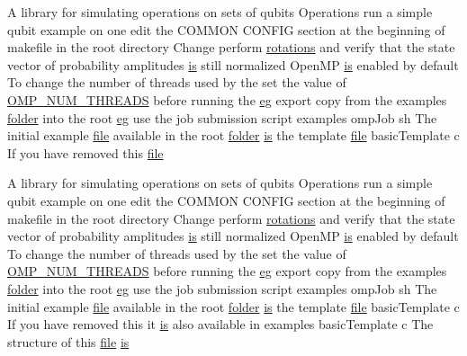 \begin{DoxyCompactItemize}
\item 
A library for simulating operations on sets of qubits Operations run a simple qubit example on one edit the COMMON CONFIG section at the beginning of makefile in the root directory Change perform \hyperlink{README_8md_a168d0f076329da35a2b080049c35cecd}{rotations} and verify that the state vector of probability amplitudes \hyperlink{README_8md_ac361bc388656077907485b42e1531a85}{is} still normalized OpenMP \hyperlink{README_8md_ac361bc388656077907485b42e1531a85}{is} enabled by default To change the number of threads used by the set the value of \hyperlink{README_8md_ac0f875e6c5b5526a6781e0fbba81e6a4}{OMP\_\-NUM\_\-THREADS} before running the \hyperlink{README_8md_a60a90a09308ad7ec0ea2ac389281518b}{eg} export copy from the examples \hyperlink{README_8md_ac5527449269e33be598e819921cd9e43}{folder} into the root \hyperlink{README_8md_a60a90a09308ad7ec0ea2ac389281518b}{eg} use the job submission script examples ompJob sh The initial example \hyperlink{README_8md_a5078360f0afc4e756290c3197d1abfe9}{file} available in the root \hyperlink{README_8md_ac5527449269e33be598e819921cd9e43}{folder} \hyperlink{README_8md_ac361bc388656077907485b42e1531a85}{is} the template \hyperlink{README_8md_a5078360f0afc4e756290c3197d1abfe9}{file} basicTemplate c If you have removed this \hyperlink{README_8md_a5078360f0afc4e756290c3197d1abfe9}{file}
\item 
A library for simulating operations on sets of qubits Operations run a simple qubit example on one edit the COMMON CONFIG section at the beginning of makefile in the root directory Change perform \hyperlink{README_8md_a168d0f076329da35a2b080049c35cecd}{rotations} and verify that the state vector of probability amplitudes \hyperlink{README_8md_ac361bc388656077907485b42e1531a85}{is} still normalized OpenMP \hyperlink{README_8md_ac361bc388656077907485b42e1531a85}{is} enabled by default To change the number of threads used by the set the value of \hyperlink{README_8md_ac0f875e6c5b5526a6781e0fbba81e6a4}{OMP\_\-NUM\_\-THREADS} before running the \hyperlink{README_8md_a60a90a09308ad7ec0ea2ac389281518b}{eg} export copy from the examples \hyperlink{README_8md_ac5527449269e33be598e819921cd9e43}{folder} into the root \hyperlink{README_8md_a60a90a09308ad7ec0ea2ac389281518b}{eg} use the job submission script examples ompJob sh The initial example \hyperlink{README_8md_a5078360f0afc4e756290c3197d1abfe9}{file} available in the root \hyperlink{README_8md_ac5527449269e33be598e819921cd9e43}{folder} \hyperlink{README_8md_ac361bc388656077907485b42e1531a85}{is} the template \hyperlink{README_8md_a5078360f0afc4e756290c3197d1abfe9}{file} basicTemplate c If you have removed this it \hyperlink{README_8md_ac361bc388656077907485b42e1531a85}{is} also available in examples basicTemplate c The structure of this \hyperlink{README_8md_a5078360f0afc4e756290c3197d1abfe9}{file} \hyperlink{README_8md_ac361bc388656077907485b42e1531a85}{is}

\end{DoxyCompactItemize}
